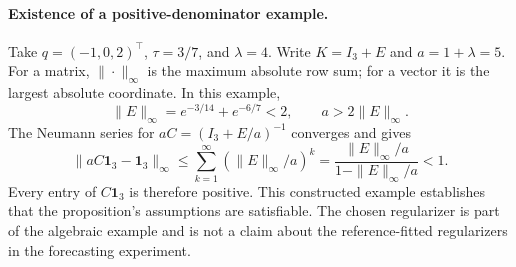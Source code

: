\paragraph{Existence of a positive-denominator example.}
Take $q=(-1,0,2)^\top$, $\tau=3/7$, and $\lambda=4$. Write $K=I_3+E$ and $a=1+\lambda=5$. For a matrix, $\|\cdot\|_\infty$ is the maximum absolute row sum; for a vector it is the largest absolute coordinate. In this example,
\[
 \|E\|_\infty=e^{-3/14}+e^{-6/7}<2,\qquad a>2\|E\|_\infty.
\]
The Neumann series for $aC=(I_3+E/a)^{-1}$ converges and gives
\[
 \|aC\mathbf1_3-\mathbf1_3\|_\infty
 \leq\sum_{k=1}^{\infty}(\|E\|_\infty/a)^k
 =\frac{\|E\|_\infty/a}{1-\|E\|_\infty/a}<1.
\]
Every entry of $C\mathbf1_3$ is therefore positive. This constructed example establishes that the proposition's assumptions are satisfiable. The chosen regularizer is part of the algebraic example and is not a claim about the reference-fitted regularizers in the forecasting experiment.
